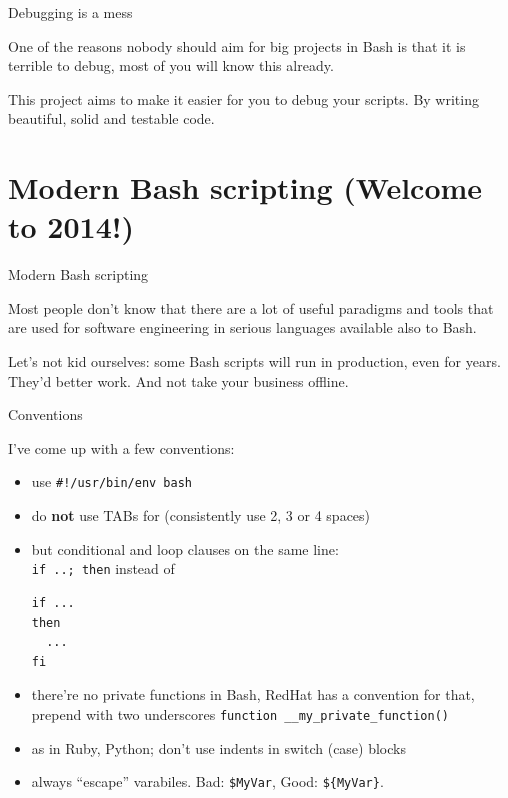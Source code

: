 \begin{frame}{}

\end{frame}

\begin{frame}{Debugging is a mess}

One of the reasons nobody should aim for big projects in Bash is that it
is terrible to debug, most of you will know this already. \vfill

This project aims to make it easier for you to debug your scripts. By
writing beautiful, solid and testable code.

\end{frame}

\section{Modern Bash scripting (Welcome to
2014!)}\label{modern-bash-scripting-welcome-to-2014}

\begin{frame}{Modern Bash scripting}

Most people don't know that there are a lot of useful paradigms and
tools that are used for software engineering in serious languages
available also to Bash.

\vfill
Let's not kid ourselves: some Bash scripts will run in production, even
for years. They'd better work. And not take your business offline.

\end{frame}

\begin{frame}[fragile]{Conventions}

I've come up with a few conventions:

\begin{itemize}
\item
  use \texttt{\#!/usr/bin/env bash}
\item
  do \textbf{not} use TABs for (consistently use 2, 3 or 4 spaces)
\item
  but conditional and loop clauses on the same line:\\
  \texttt{if ..; then} instead of

\begin{verbatim}
if ...
then
  ...
fi
\end{verbatim}
\item
  there're no private functions in Bash, RedHat has a convention for
  that, prepend with two underscores
  \texttt{function \_\_my\_private\_function()}
\item
  as in Ruby, Python; don't use indents in switch (case) blocks
\item
  always ``escape'' varabiles. Bad: \texttt{\$MyVar}, Good:
  \texttt{\$\{MyVar\}}.
\end{itemize}

\end{frame}

